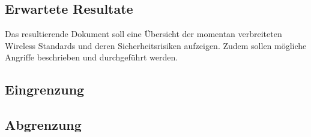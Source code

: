 \subsection{Erwartete Resultate}
Das resultierende Dokument soll eine Übersicht der momentan verbreiteten Wireless Standards und deren Sicherheitsrisiken aufzeigen.
Zudem sollen mögliche Angriffe beschrieben und durchgeführt werden.



\subsection{Eingrenzung}

\subsection{Abgrenzung}


